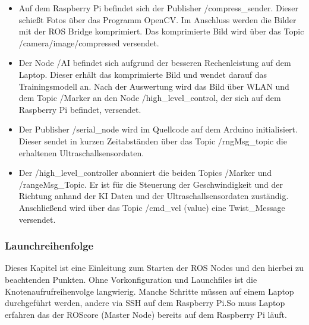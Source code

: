 \documentclass[conference]{IEEEtran}
\begin{document}
	\begin{itemize}
		\item Auf dem Raspberry Pi befindet sich der Publisher /compress\_sender. Dieser schießt Fotos über das Programm OpenCV. Im Anschluss werden die Bilder mit der ROS Bridge komprimiert. Das komprimierte Bild wird über das Topic /camera/image/compressed versendet.
		
		\item Der Node /AI befindet sich aufgrund der besseren Rechenleistung auf dem Laptop. Dieser erhält das komprimierte Bild und wendet darauf das Trainingsmodell an. Nach der Auswertung wird das Bild über WLAN und dem Topic /Marker an den Node /high\_level\_control, der sich auf dem Raspberry Pi befindet, versendet.
		
		\item Der Publisher /serial\_node wird im Quellcode auf dem Arduino initialisiert. Dieser sendet in kurzen Zeitabständen über das Topic /rngMsg\_topic die erhaltenen Ultraschallsensordaten.
		
		\item Der /high\_level\_controller abonniert die beiden Topics /Marker und /rangeMsg\_Topic. Er ist für die Steuerung der Geschwindigkeit und der Richtung anhand der KI Daten und der Ultraschallsensordaten zuständig. Anschließend wird über das Topic /cmd\_vel (value) eine Twist\_Message versendet.
		
		
	\end{itemize}

	\subsubsection{Launchreihenfolge}%
	
	Dieses Kapitel ist eine Einleitung zum Starten der ROS Nodes und den 
	hierbei zu beachtenden Punkten. Ohne Vorkonfiguration und Launchfiles ist 
	die Knotenaufrufreihenvolge langwierig. Manche Schritte müssen auf einem 
	Laptop durchgeführt werden, andere via SSH auf dem Raspberry Pi.So muss 
	Laptop erfahren das der ROScore (Master Node) bereits auf dem Raspberry 
	Pi läuft.
	
\end{document}
